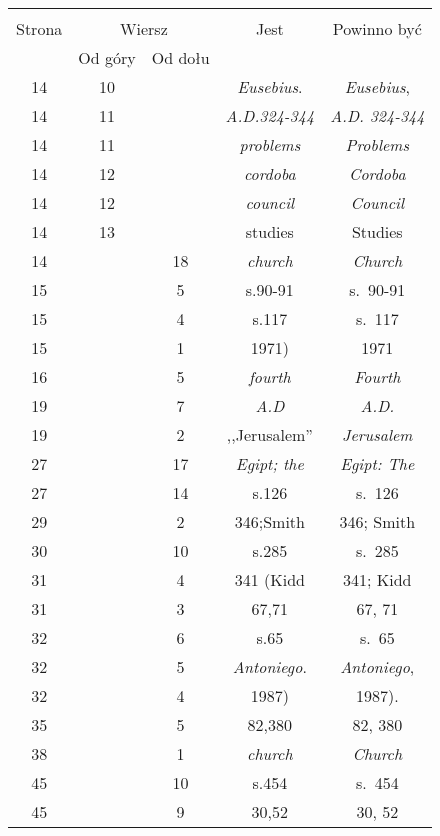 \documentclass[a4paper,11pt]{article}
\begin{document}
\begin{center}
  \begin{tabular}{|c|c|c|c|c|}
    \hline
    & \multicolumn{2}{c|}{} & & \\
    Strona & \multicolumn{2}{c|}{Wiersz} & Jest
                              & Powinno być \\ \cline{2-3}
    & Od góry & Od dołu & & \\
    \hline
    14  & 10 & & \emph{Eusebius}. & \emph{Eusebius}, \\
    14  & 11 & & \emph{A.D.324-344} & \emph{A.D. 324-344} \\
    14  & 11 & & \emph{problems} & \emph{Problems} \\
    14  & 12 & & \emph{cordoba} & \emph{Cordoba} \\
    14  & 12 & & \emph{council} & \emph{Council} \\
    14  & 13 & & studies & Studies \\
    14  & & 18 & \emph{church} & \emph{Church} \\
    15  & &  5 & s.90-91 & s.~90-91 \\
    15  & &  4 & s.117 & s.~117 \\
    15  & &  1 & 1971) & 1971 \\
    16  & &  5 & \emph{fourth} & \emph{Fourth} \\
    19  & &  7 & \emph{A.D} & \emph{A.D.} \\
    19  & &  2 & ,,Jerusalem'' & \emph{Jerusalem} \\
    27  & & 17 & \emph{Egipt; the} & \emph{Egipt: The} \\
    27  & & 14 & s.126 & s.~126 \\
    29  & &  2 & 346;Smith & 346; Smith\\
    30  & & 10 & s.285 & s.~285 \\
    31  & &  4 & 341 (Kidd & 341; Kidd \\
    31  & &  3 & 67,71 & 67, 71 \\
    32  & &  6 & s.65 & s.~65 \\
    32  & &  5 & \emph{Antoniego}. & \emph{Antoniego}, \\
    32  & &  4 & 1987) & 1987). \\
    35  & &  5 & 82,380 & 82, 380 \\
    38  & &  1 & \emph{church} & \emph{Church} \\
    45  & & 10 & s.454 & s.~454 \\
    45  & &  9 & 30,52 & 30, 52 \\

\end{tabular}
\end{center}
\end{document}
